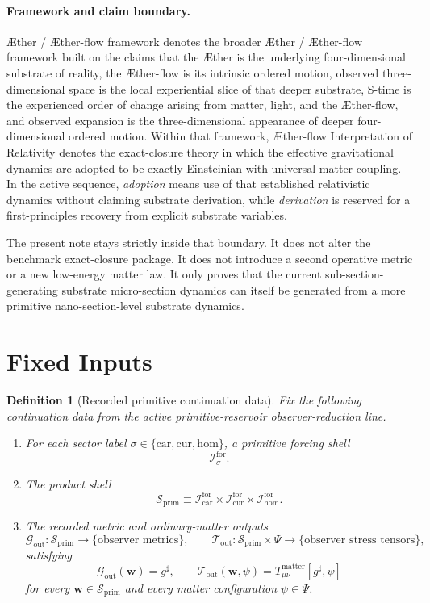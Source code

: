 \documentclass[11pt]{article}
\newcommand{\Aether}{\AE{}ther}
\newcommand{\Aflow}{\AE{}ther-flow}
\newcommand{\TheoryName}{\Aflow{} Interpretation of Relativity}
\newcommand{\TheoryProgram}{\Aether{} / \Aflow{} framework}
\newcommand{\CompletedMetric}{g^{\sharp}}
\newcommand{\MatterSpace}{\Psi}
\newcommand{\Car}{\mathrm{car}}
\newcommand{\Cur}{\mathrm{cur}}
\newcommand{\Hom}{\mathrm{hom}}
\newcommand{\ForSpace}[1]{\mathcal I_{#1}^{\mathrm{for}}}
\newcommand{\PrimShell}{\mathcal S_{\mathrm{prim}}}
\newcommand{\MetricOut}{\mathscr G_{\mathrm{out}}}
\newcommand{\MatterOut}{\mathscr T_{\mathrm{out}}}
\newtheorem{definition}{Definition}
\begin{document}
\paragraph{Framework and claim boundary.}
\TheoryProgram{} denotes the broader \Aether{} / \Aflow{} framework built on the claims that the \Aether{} is the underlying four-dimensional substrate of reality, the \Aflow{} is its intrinsic ordered motion, observed three-dimensional space is the local experiential slice of that deeper substrate, S-time is the experienced order of change arising from matter, light, and the \Aflow{}, and observed expansion is the three-dimensional appearance of deeper four-dimensional ordered motion. Within that framework, \TheoryName{} denotes the exact-closure theory in which the effective gravitational dynamics are adopted to be exactly Einsteinian with universal matter coupling. In the active sequence, \emph{adoption} means use of that established relativistic dynamics without claiming substrate derivation, while \emph{derivation} is reserved for a first-principles recovery from explicit substrate variables.

The present note stays strictly inside that boundary. It does not alter the benchmark exact-closure package. It does not introduce a second operative metric or a new low-energy matter law. It only proves that the current sub-section-generating substrate micro-section dynamics can itself be generated from a more primitive nano-section-level substrate dynamics.

\section{Fixed Inputs}

\begin{definition}[Recorded primitive continuation data]
\label{def:fixed}
Fix the following continuation data from the active primitive-reservoir observer-reduction line.
\begin{enumerate}
    \item For each sector label \(\sigma\in\{\Car,\Cur,\Hom\}\), a primitive forcing shell
    \[
    \ForSpace{\sigma}.
    \]
    \item The product shell
    \[
    \PrimShell
    \equiv
    \ForSpace{\Car}\times \ForSpace{\Cur}\times \ForSpace{\Hom}.
    \]
    \item The recorded metric and ordinary-matter outputs
    \[
    \MetricOut:\PrimShell\to\{\text{observer metrics}\},
    \qquad
    \MatterOut:\PrimShell\times\MatterSpace\to\{\text{observer stress tensors}\},
    \]
    satisfying
    \begin{equation}
    \MetricOut(\mathbf w)=\CompletedMetric,
    \qquad
    \MatterOut(\mathbf w,\psi)
    =
    T_{\mu\nu}^{\mathrm{matter}}[\CompletedMetric,\psi]
    \label{eq:fixedoutputs}
    \end{equation}
    for every \(\mathbf w\in\PrimShell\) and every matter configuration \(\psi\in\MatterSpace\).
\end{enumerate}
\end{definition}
\end{document}
